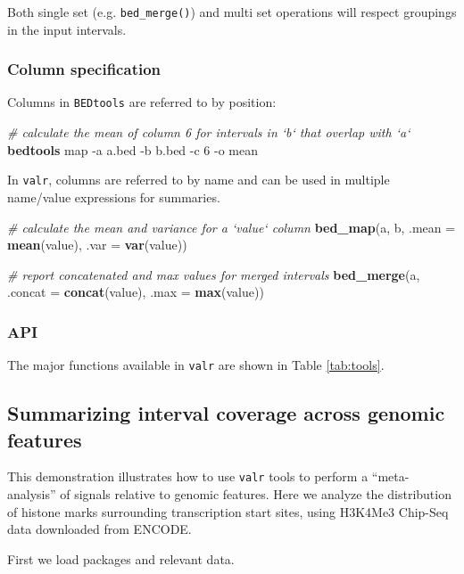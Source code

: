 \documentclass[9pt,a4paper]{extarticle}
\renewcommand{\KeywordTok}[1]{\textbf{{#1}}}
\renewcommand{\DataTypeTok}[1]{\textcolor[rgb]{0.50,0.00,0.00}{{#1}}}
\renewcommand{\CommentTok}[1]{\textcolor[rgb]{0.50,0.50,0.50}{\textit{{#1}}}}
\renewcommand{\NormalTok}[1]{{#1}}
\begin{document}
Both single set (e.g. \texttt{bed\_merge()}) and multi set operations
will respect groupings in the input intervals.

\subsubsection*{Column specification}\label{column-specification}

Columns in \texttt{BEDtools} are referred to by position:

\begin{Highlighting}[]
\CommentTok{# calculate the mean of column 6 for intervals in `b` that overlap with `a`}
\KeywordTok{bedtools} \NormalTok{map -a a.bed -b b.bed -c 6 -o mean}
\end{Highlighting}

In \texttt{valr}, columns are referred to by name and can be used in
multiple name/value expressions for summaries.

\begin{Highlighting}[]
\CommentTok{# calculate the mean and variance for a `value` column}
\KeywordTok{bed_map}\NormalTok{(a, b, }\DataTypeTok{.mean =} \KeywordTok{mean}\NormalTok{(value), }\DataTypeTok{.var =} \KeywordTok{var}\NormalTok{(value))}

\CommentTok{# report concatenated and max values for merged intervals}
\KeywordTok{bed_merge}\NormalTok{(a, }\DataTypeTok{.concat =} \KeywordTok{concat}\NormalTok{(value), }\DataTypeTok{.max =} \KeywordTok{max}\NormalTok{(value))}
\end{Highlighting}


\subsubsection*{API}\label{api}
The major functions available in \texttt{valr} are shown in Table \ref{tab:tools}.

\subsection*{Summarizing interval coverage across genomic features}

This demonstration illustrates how to use \texttt{valr} tools to perform
a ``meta-analysis'' of signals relative to genomic features. Here we
analyze the distribution of histone marks surrounding transcription
start sites, using H3K4Me3 Chip-Seq data downloaded from ENCODE.

First we load packages and relevant data.
\end{document}
